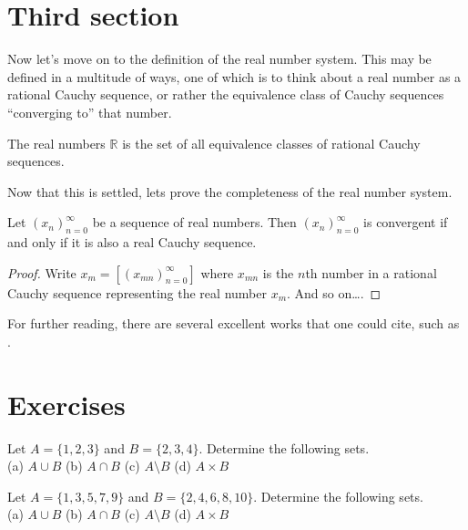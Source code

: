 \documentclass{tstextbook}
\begin{document}
\section{Third section}

Now let's move on to the definition of the real number system. This
may be defined in a multitude of ways, one of which is to think about
a real number as a rational Cauchy sequence, or rather the equivalence
class of Cauchy sequences ``converging to'' that number.

\begin{definition}
  \label{def:realnumbers}
  The real numbers $\mathbb{R}$ is the set of all equivalence classes
  of rational Cauchy sequences.
\end{definition}

Now that this is settled, lets prove the completeness of the real
number system.

\begin{theorem}
  \label{th:realnumberscomplete}
  Let $(x_n)_{n=0}^{\infty}$ be a sequence of real numbers.
  Then $(x_n)_{n=0}^{\infty}$ is convergent if and only if
  it is also a real Cauchy sequence.
  \end{theorem}
\begin{proof}
  Write $x_m = [(x_{mn})_{n=0}^{\infty}]$ where
  $x_{mn}$ is the $n$th number in a rational Cauchy sequence
  representing the real number $x_m$. And so on\ldots.
\end{proof}

For further reading, there are several excellent works that one could
cite, such as \cite{Tao2006,Turing1936}.

\section*{Exercises}

\begin{exercise}
  Let $A = \{1, 2, 3\}$ and $B = \{2, 3, 4\}$.
  Determine the following sets. \\
  (a) $A \cup B$ \quad
  (b) $A \cap B$ \quad
  (c) $A \setminus B$ \quad
  (d) $A \times B$
\end{exercise}

\begin{exercise}
  Let $A = \{1, 3, 5, 7, 9\}$ and $B = \{2, 4, 6, 8, 10\}$.
  Determine the following sets. \\
  (a) $A \cup B$ \quad
  (b) $A \cap B$ \quad
  (c) $A \setminus B$ \quad
  (d) $A \times B$
\end{exercise}
\end{document}

